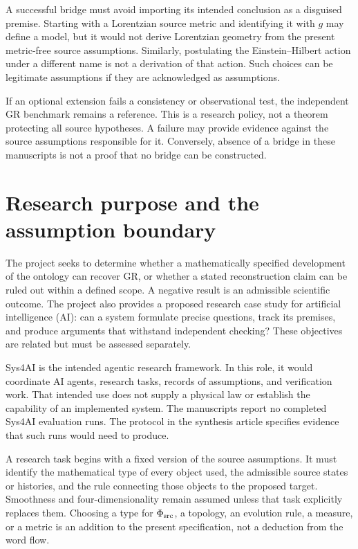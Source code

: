 \documentclass[11pt]{article}
\begin{document}
A successful bridge must avoid importing its intended conclusion as a disguised premise. Starting with a Lorentzian source metric and identifying it with $g$ may define a model, but it would not derive Lorentzian geometry from the present metric-free source assumptions. Similarly, postulating the Einstein--Hilbert action under a different name is not a derivation of that action. Such choices can be legitimate assumptions if they are acknowledged as assumptions.

If an optional extension fails a consistency or observational test, the independent GR benchmark remains a reference. This is a research policy, not a theorem protecting all source hypotheses. A failure may provide evidence against the source assumptions responsible for it. Conversely, absence of a bridge in these manuscripts is not a proof that no bridge can be constructed.

\section{Research purpose and the assumption boundary}
The project seeks to determine whether a mathematically specified development of the ontology can recover GR, or whether a stated reconstruction claim can be ruled out within a defined scope. A negative result is an admissible scientific outcome. The project also provides a proposed research case study for artificial intelligence (AI): can a system formulate precise questions, track its premises, and produce arguments that withstand independent checking? These objectives are related but must be assessed separately.

Sys4AI is the intended agentic research framework. In this role, it would coordinate AI agents, research tasks, records of assumptions, and verification work. That intended use does not supply a physical law or establish the capability of an implemented system. The manuscripts report no completed Sys4AI evaluation runs. The protocol in the synthesis article specifies evidence that such runs would need to produce.

A research task begins with a fixed version of the source assumptions. It must identify the mathematical type of every object used, the admissible source states or histories, and the rule connecting those objects to the proposed target. Smoothness and four-dimensionality remain assumed unless that task explicitly replaces them. Choosing a type for $\Phi_{\mathrm{src}}$, a topology, an evolution rule, a measure, or a metric is an addition to the present specification, not a deduction from the word flow.
\end{document}
